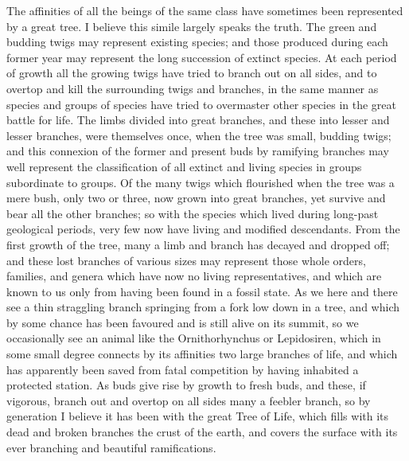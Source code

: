 The affinities of all the beings of the same class have sometimes been represented by a great tree. I believe this simile largely speaks the truth. The green and budding twigs may represent existing species; and those produced during each former year may represent the long succession of extinct species. At each period of growth all the growing twigs have tried to branch out on all sides, and to overtop and kill the surrounding twigs and branches, in the same manner as species and groups of species have tried to overmaster other species in the great battle for life. The limbs divided into great branches, and these into lesser and lesser branches, were themselves once, when the tree was small, budding twigs; and this connexion of the former and present buds by ramifying branches may well represent the classification of all extinct and living species in groups subordinate to groups. Of the many twigs which flourished when the tree was a mere bush, only two or three, now grown into great branches, yet survive and bear all the other branches; so with the species which lived during long-past geological periods, very few now have living and modified descendants. From the first growth of the tree, many a limb and branch has decayed and dropped off; and these lost branches of various sizes may represent those whole orders, families, and genera which have now no living representatives, and which are known to us only from having been found in a fossil state. As we here and there see a thin straggling branch springing from a fork low down in a tree, and which by some chance has been favoured and is still alive on its summit, so we occasionally see an animal like the Ornithorhynchus or Lepidosiren, which in some small degree connects by its affinities two large branches of life, and which has apparently been saved from fatal competition by having inhabited a protected station. As buds give rise by growth to fresh buds, and these, if vigorous, branch out and overtop on all sides many a feebler branch, so by generation I believe it has been with the great Tree of Life, which fills with its dead and broken branches the crust of the earth, and covers the surface with its ever branching and beautiful ramifications. 